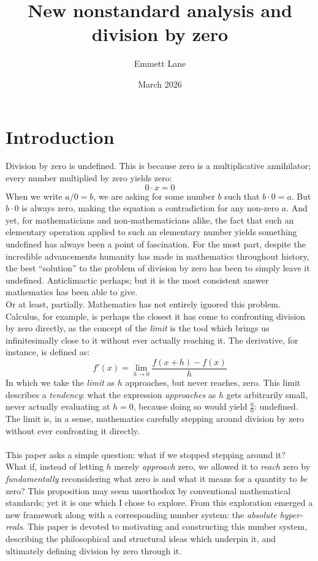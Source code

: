 \documentclass{article}
\title{New nonstandard analysis and division by zero}
\author{Emmett Lane}
\date{March 2026}
\begin{document}
\setcounter{secnumdepth}{0}
\maketitle
\newpage
\tableofcontents
\newpage


\section{Introduction}

Division by zero is undefined. This is because zero is a multiplicative 
annihilator; every number multiplied by zero yields zero:
\[
0 \cdot x = 0
\]
When we write $a/0 = b$, we are asking for some number $b$ such that 
$b \cdot 0 = a$. But $b \cdot 0$ is always zero, making the equation a 
contradiction for any non-zero $a$. And yet, for mathematicians and 
non-mathematicians alike, the fact that such an elementary operation applied 
to such an elementary number yields something undefined has always been a 
point of fascination. For the most part, despite the incredible advancements 
humanity has made in mathematics throughout history, the best ``solution'' to 
the problem of division by zero has been to simply leave it undefined. 
Anticlimactic perhaps; but it is the most consistent answer mathematics has 
been able to give.\\Or at least, partially. Mathematics has not entirely ignored this problem. 
Calculus, for example, is perhaps the closest it has come to confronting division by zero 
directly, as the concept of the \textit{limit} is the tool which brings us 
infinitesimally close to it without ever actually reaching it. The derivative, 
for instance, is defined as:
\[
f'(x) = \lim_{h \to 0} \frac{f(x+h) - f(x)}{h}
\]
In which we take the \textit{limit} as $h$ approaches, but never reaches, 
zero. This limit describes a \textit{tendency}: what the expression 
\textit{approaches} as $h$ gets arbitrarily small, never actually evaluating 
at $h = 0$, because doing so would yield $\frac{0}{0}$: undefined. The limit 
is, in a sense, mathematics carefully stepping around division by zero without 
ever confronting it directly.\\\\This paper asks a simple question: what if we stopped stepping around it?\\What if, instead of letting $h$ merely \textit{approach} zero, we allowed it 
to \textit{reach} zero by \textit{fundamentally} reconsidering what zero is 
and what it means for a quantity to \textit{be} zero? This proposition may 
seem unorthodox by conventional mathematical standards; yet it is one which 
I chose to explore. From this exploration emerged a new framework along with 
a corresponding number system: the \textit{absolute hyper-reals}. This paper 
is devoted to motivating and constructing this number system, describing the 
philosophical and structural ideas which underpin it, and ultimately defining 
division by zero through it.
\end{document}
